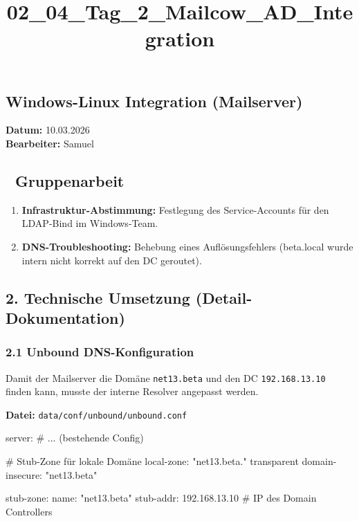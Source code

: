 \documentclass[
]{article}
\title{02\_04\_Tag\_2\_Mailcow\_AD\_Integration}
\author{}
\date{}
\newenvironment{Shaded}{}{}
\newcommand{\NormalTok}[1]{#1}
\providecommand{\tightlist}{%
  \setlength{\itemsep}{0pt}\setlength{\parskip}{0pt}}
\begin{document}
\maketitle

\subsection{Windows-Linux Integration
(Mailserver)}\label{windows-linux-integration-mailserver}

\textbf{Datum:} 10.03.2026\\
\textbf{Bearbeiter:} Samuel

\subsection{👥 Gruppenarbeit}\label{gruppenarbeit}

\begin{enumerate}
\tightlist
\item
  \textbf{Infrastruktur-Abstimmung:} Festlegung des Service-Accounts für
  den LDAP-Bind im Windows-Team.
\item
  \textbf{DNS-Troubleshooting:} Behebung eines Auflösungsfehlers
  (beta.local wurde intern nicht korrekt auf den DC geroutet).
\end{enumerate}

\subsection{2. Technische Umsetzung
(Detail-Dokumentation)}\label{technische-umsetzung-detail-dokumentation}

\subsubsection{2.1 Unbound
DNS-Konfiguration}\label{unbound-dns-konfiguration}

Damit der Mailserver die Domäne \texttt{net13.beta} und den DC
\texttt{192.168.13.10} finden kann, musste der interne Resolver
angepasst werden.

\textbf{Datei:} \texttt{data/conf/unbound/unbound.conf}

\begin{Shaded}
\begin{Highlighting}[]
\NormalTok{server:}
\NormalTok{  \# ... (bestehende Config)}
  
\NormalTok{  \# Stub{-}Zone für lokale Domäne}
\NormalTok{  local{-}zone: "net13.beta." transparent}
\NormalTok{  domain{-}insecure: "net13.beta"}

\NormalTok{stub{-}zone:}
\NormalTok{  name: "net13.beta"}
\NormalTok{  stub{-}addr: 192.168.13.10  \# IP des Domain Controllers}
\end{Highlighting}
\end{Shaded}
\end{document}
